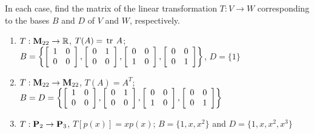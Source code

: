 \begin{multicols}{1}
\begin{ex}
\begin{sol}
\begin{enumerate}[label={\alph*.}]
\end{enumerate}
\end{sol}
\end{ex}

\begin{ex}
In each case, find the matrix of the linear transformation $T : V \to W$ corresponding to the bases $B$ and $D$ of $V$ and $W$, respectively.


\begin{enumerate}[label={\alph*.}]
\item $T : \textbf{M}_{22} \to \mathbb{R}$, $T(A) = \thinspace\operatorname{tr \medspace} A$; \\
\hspace*{-1em}$B= \left\{ \left[ \begin{array}{rr} 1 & 0 \\ 0 & 0 \end{array} \right], \left[ \begin{array}{rr} 0 & 1 \\ 0 & 0 \end{array} \right], \left[ \begin{array}{rr} 0 & 0 \\ 1 & 0 \end{array} \right], \left[ \begin{array}{rr} 0 & 0 \\ 0 & 1 \end{array} \right] \right\}$,
$D = \{1\}$


\item $T : \textbf{M}_{22} \to \textbf{M}_{22}$, $T(A) = A^T$; 
\\ \hspace*{-1em}$B = D \\ = \left\{ \left[ \begin{array}{rr} 1 & 0 \\ 0 & 0 \end{array} \right], \left[ \begin{array}{rr} 0 & 1 \\ 0 & 0 \end{array} \right], \left[ \begin{array}{rr} 0 & 0 \\ 1 & 0 \end{array} \right], \left[ \begin{array}{rr} 0 & 0 \\ 0 & 1 \end{array} \right] \right\}$


\item $T : \textbf{P}_2 \to \textbf{P}_3$, $T[p(x)] = xp(x)$; 
$B = \{1, x, x^2\}$ and $D = \{1, x, x^2, x^3\}$


\end{enumerate}
\end{ex}
\end{multicols}
